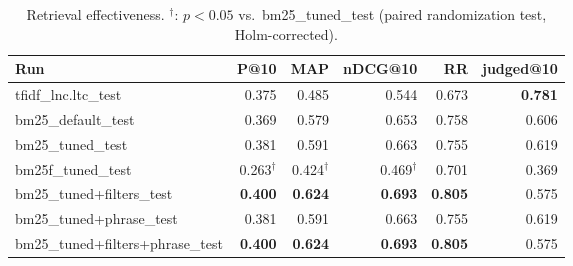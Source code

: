 \begin{table}[t]
\centering
\begin{tabular}{lrrrrr}
\toprule
Run & P@10 & MAP & nDCG@10 & RR & judged@10 \\
\midrule
tfidf\_lnc.ltc\_test & 0.375 & 0.485 & 0.544 & 0.673 & \textbf{0.781} \\
bm25\_default\_test & 0.369 & 0.579 & 0.653 & 0.758 & 0.606 \\
bm25\_tuned\_test & 0.381 & 0.591 & 0.663 & 0.755 & 0.619 \\
bm25f\_tuned\_test & 0.263$^\dagger$ & 0.424$^\dagger$ & 0.469$^\dagger$ & 0.701 & 0.369 \\
bm25\_tuned+filters\_test & \textbf{0.400} & \textbf{0.624} & \textbf{0.693} & \textbf{0.805} & 0.575 \\
bm25\_tuned+phrase\_test & 0.381 & 0.591 & 0.663 & 0.755 & 0.619 \\
bm25\_tuned+filters+phrase\_test & \textbf{0.400} & \textbf{0.624} & \textbf{0.693} & \textbf{0.805} & 0.575 \\
\bottomrule
\end{tabular}
\caption{Retrieval effectiveness. $^\dagger$: $p<0.05$ vs.\ bm25\_tuned\_test (paired randomization test, Holm-corrected).}
\end{table}

